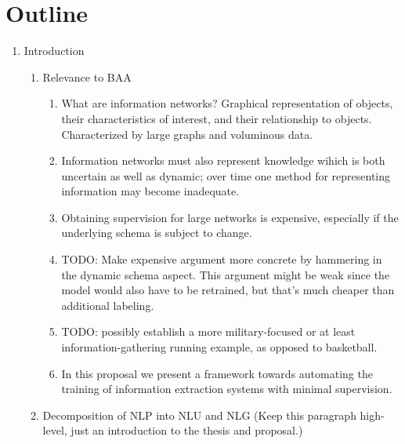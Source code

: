 \documentclass[11pt]{article}
\newcommand\set[1]{\left\{#1\right\}}
\newcommand{\bc}{\mathbf{c}}
\newcommand{\be}{\mathbf{e}}
\newcommand{\br}{\mathbf{r}}
\newcommand{\bt}{\mathbf{t}}
\newcommand{\bv}{\mathbf{v}}
\newcommand{\bx}{\mathbf{x}}
\newcommand{\by}{\mathbf{y}}
\newcommand{\bz}{\mathbf{z}}
\begin{document}
\begin{comment}
For task (\textsc{align}), we have the fully observed summary $\by$,
the unobserved content plan $\bz=\bc$, and all records as conditioning $\bx=\br$.
For task (\textsc{values}), we again have the observed summary $\by$,
but we pretend the values are unobserved $\bz=\set{\bc,\bv}$, and
use the rest of the records as conditioning $\bx=\set{\be,\bt}$.
(TODO: functions)
\end{comment}

\newpage

\section*{Outline}
\begin{enumerate}
\item Introduction
    \begin{enumerate}
    \item Relevance to BAA
        \begin{enumerate}
        \item What are information networks?
            Graphical representation of objects, their characteristics of interest, and their relationship to objects.
            Characterized by large graphs and voluminous data.
        \item Information networks must also represent knowledge wihich is both
            uncertain as well as dynamic;
            over time one method for representing information may become inadequate.
        \item Obtaining supervision for large networks is expensive,
            especially if the underlying schema is subject to change.
        \item TODO: Make expensive argument more concrete by hammering in the dynamic schema aspect.
            This argument might be weak since the model would also have to be retrained,
            but that's much cheaper than additional labeling.
        \item TODO: possibly establish a more military-focused
            or at least information-gathering running example, as opposed to basketball.
        \item In this proposal we present a framework towards automating the
            training of information extraction systems with minimal supervision.
        \end{enumerate}
    \item Decomposition of NLP into NLU and NLG
        (Keep this paragraph high-level, just an introduction to the thesis and proposal.)

\end{enumerate}
\end{enumerate}
\end{document}
